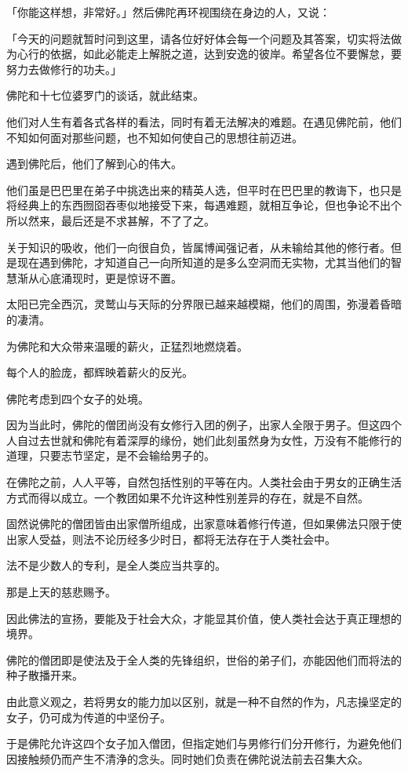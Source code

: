 \documentclass[twoside,openany]{book}
\begin{document}
「你能这样想，非常好。」然后佛陀再环视围绕在身边的人，又说：

「今天的问题就暂时问到这里，请各位好好体会每一个问题及其答案，切实将法做为心行的依据，如此必能走上解脱之道，达到安逸的彼岸。希望各位不要懈怠，要努力去做修行的功夫。」

佛陀和十七位婆罗门的谈话，就此结束。

他们对人生有着各式各样的看法，同时有着无法解决的难题。在遇见佛陀前，他们不知如何面对那些问题，也不知如何使自己的思想往前迈进。

遇到佛陀后，他们了解到心的伟大。

他们虽是巴巴里在弟子中挑选出来的精英人选，但平时在巴巴里的教诲下，也只是将经典上的东西囫囵吞枣似地接受下来，每遇难题，就相互争论，但也争论不出个所以然来，最后还是不求甚解，不了了之。

关于知识的吸收，他们一向很自负，皆属博闻强记者，从未输给其他的修行者。但是现在遇到佛陀，才知道自己一向所知道的是多么空洞而无实物，尤其当他们的智慧渐从心底涌现时，更是惊讶不置。

太阳已完全西沉，灵鹫山与天际的分界限已越来越模糊，他们的周围，弥漫着昏暗的凄清。

为佛陀和大众带来温暖的薪火，正猛烈地燃烧着。

每个人的脸庞，都辉映着薪火的反光。

佛陀考虑到四个女子的处境。

因为当此时，佛陀的僧团尚没有女修行入团的例子，出家人全限于男子。但这四个人自过去世就和佛陀有着深厚的缘份，她们此刻虽然身为女性，万没有不能修行的道理，只要志节坚定，是不会输给男子的。

在佛陀之前，人人平等，自然包括性别的平等在内。人类社会由于男女的正确生活方式而得以成立。一个教团如果不允许这种性别差异的存在，就是不自然。

固然说佛陀的僧团皆由出家僧所组成，出家意味着修行传道，但如果佛法只限于使出家人受益，则法不论历经多少时日，都将无法存在于人类社会中。

法不是少数人的专利，是全人类应当共享的。

那是上天的慈悲赐予。

因此佛法的宣扬，要能及于社会大众，才能显其价值，使人类社会达于真正理想的境界。

佛陀的僧团即是使法及于全人类的先锋组织，世俗的弟子们，亦能因他们而将法的种子散播开来。

由此意义观之，若将男女的能力加以区别，就是一种不自然的作为，凡志操坚定的女子，仍可成为传道的中坚份子。

于是佛陀允许这四个女子加入僧团，但指定她们与男修行们分开修行，为避免他们因接触频仍而产生不清浄的念头。同时她们负责在佛陀说法前去召集大众。
\end{document}
